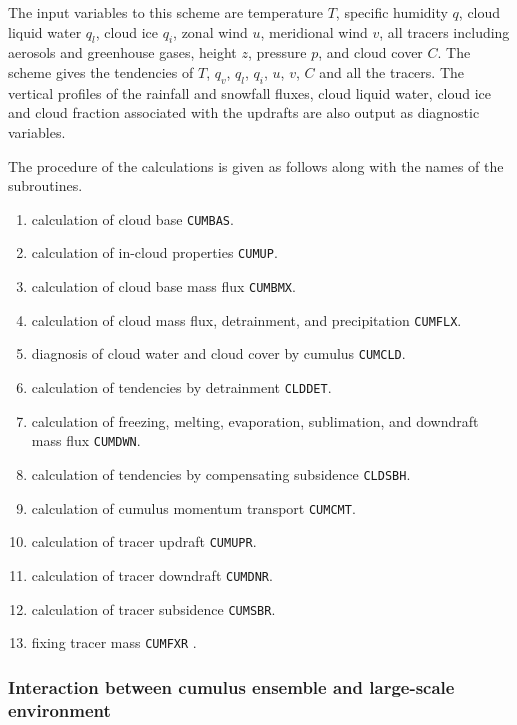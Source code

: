 The input variables to this scheme are temperature \(T\), specific
humidity \(q\), cloud liquid water \(q_l\), cloud ice \(q_i\), zonal
wind \(u\), meridional wind \(v\), all tracers including aerosols and
greenhouse gases, height \(z\), pressure \(p\), and cloud cover \(C\).
The scheme gives the tendencies of \(T\), \(q_v\), \(q_l\), \(q_i\),
\(u\), \(v\), \(C\) and all the tracers. The vertical profiles of the
rainfall and snowfall fluxes, cloud liquid water, cloud ice and cloud
fraction associated with the updrafts are also output as diagnostic
variables.

The procedure of the calculations is given as follows along with the
names of the subroutines.

\begin{enumerate}
\def\labelenumi{\arabic{enumi}.}
\tightlist
\item
  calculation of cloud base \texttt{CUMBAS}.
\item
  calculation of in-cloud properties \texttt{CUMUP}.
\item
  calculation of cloud base mass flux \texttt{CUMBMX}.
\item
  calculation of cloud mass flux, detrainment, and precipitation
  \texttt{CUMFLX}.
\item
  diagnosis of cloud water and cloud cover by cumulus \texttt{CUMCLD}.
\item
  calculation of tendencies by detrainment \texttt{CLDDET}.
\item
  calculation of freezing, melting, evaporation, sublimation, and
  downdraft mass flux \texttt{CUMDWN}.
\item
  calculation of tendencies by compensating subsidence \texttt{CLDSBH}.
\item
  calculation of cumulus momentum transport \texttt{CUMCMT}.
\item
  calculation of tracer updraft \texttt{CUMUPR}.
\item
  calculation of tracer downdraft \texttt{CUMDNR}.
\item
  calculation of tracer subsidence \texttt{CUMSBR}.
\item
  fixing tracer mass \texttt{CUMFXR} .
\end{enumerate}

\hypertarget{interaction-between-cumulus-ensemble-and-large-scale-environment}{%
\subsubsection{Interaction between cumulus ensemble and large-scale
environment}\label{interaction-between-cumulus-ensemble-and-large-scale-environment}}

